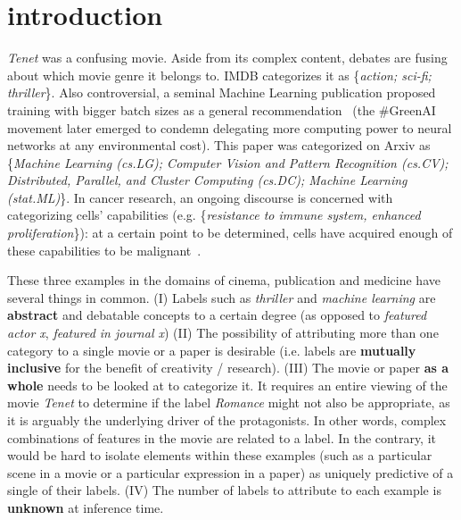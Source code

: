 
\section{introduction}
\label{sec:org662677c}







\textit{Tenet} was a confusing movie. Aside from its complex content, debates are fusing about which movie genre it belongs to. IMDB categorizes it as \{\textit{action; sci-fi; thriller}\}. Also controversial, a seminal Machine Learning publication proposed training with bigger batch sizes as a general recommendation~\cite{bigBS} (the \#GreenAI movement later emerged to condemn delegating more computing power to neural networks at any environmental cost). This paper was categorized on Arxiv as \{\textit{Machine Learning (cs.LG); Computer Vision and Pattern Recognition (cs.CV); Distributed, Parallel, and Cluster Computing (cs.DC); Machine Learning (stat.ML)}\}. In cancer research, an ongoing discourse is concerned with categorizing cells' capabilities (e.g. \{\textit{resistance to immune system, enhanced proliferation}\}): at a certain point to be determined, cells have acquired enough of these capabilities to be malignant~\cite{cancerHallmarks}.

These three examples in the domains of cinema, publication and medicine have several things in common. (I) Labels such as \textit{thriller} and \textit{machine learning} are \textbf{abstract} and debatable concepts to a certain degree (as opposed to \textit{featured actor x}, \textit{featured in journal x}) (II) The possibility of attributing more than one category to a single movie or a paper is desirable (i.e. labels are \textbf{mutually inclusive} for the benefit of creativity / research). (III) The movie or paper \textbf{as a whole} needs to be looked at to categorize it. It requires an entire viewing of the movie \textit{Tenet} to determine if the label \textit{Romance} might not also be appropriate, as it is arguably the underlying driver of the protagonists. In other words, complex combinations of features in the movie are related to a label. In the contrary, it would be hard to isolate elements within these examples (such as a particular scene in a movie or a particular expression in a paper) as uniquely predictive of a single of their labels. (IV) The number of labels to attribute to each example is \textbf{unknown} at inference time.


